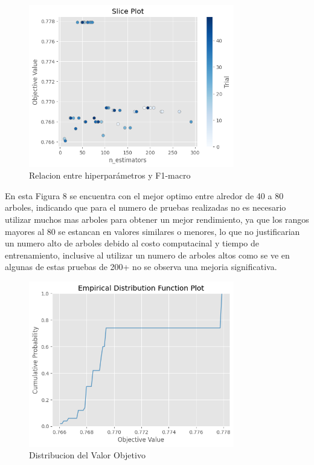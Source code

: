 \documentclass[12pt,a4paper]{article}
\begin{document}
\begin{figure}[H]
  \centering
  \includegraphics[width=0.8\textwidth]{../img/SlicePlotRandomForest.png}
  \caption{Relacion entre hiperparámetros y F1-macro}\label{fig:slice-plot-random-forest}
\end{figure}

En esta Figura 8 se encuentra con el mejor optimo entre alredor de 40 a 80 arboles, indicando que para el numero
de pruebas realizadas no es necesario utilizar muchos mas arboles para obtener un mejor rendimiento, ya que
los rangos mayores al 80 se estancan en valores similares o menores, lo que no justificarian un numero alto
de arboles debido al costo computacinal y tiempo de entrenamiento, inclusive al utilizar
un numero de arboles altos como se ve en algunas de estas pruebas de 200+ no se observa una mejoria significativa.

\begin{figure}[H]
  \centering
  \includegraphics[width=0.8\textwidth]{../img/EDFRandomForest.png}
  \caption{Distribucion del Valor Objetivo}\label{fig:edf-random-forest}
\end{figure}
\end{document}
